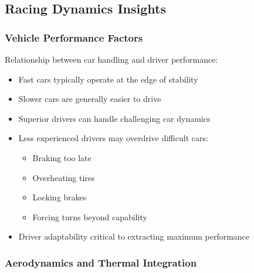 \subsection*{Racing Dynamics Insights}

\subsubsection*{Vehicle Performance Factors}

Relationship between car handling and driver performance:
\begin{itemize}
    \item Fast cars typically operate at the edge of stability
    \item Slower cars are generally easier to drive
    \item Superior drivers can handle challenging car dynamics
    \item Less experienced drivers may overdrive difficult cars:
    \begin{itemize}
        \item Braking too late
        \item Overheating tires
        \item Locking brakes
        \item Forcing turns beyond capability
    \end{itemize}
    \item Driver adaptability critical to extracting maximum performance
\end{itemize}

\subsubsection*{Aerodynamics and Thermal Integration}

